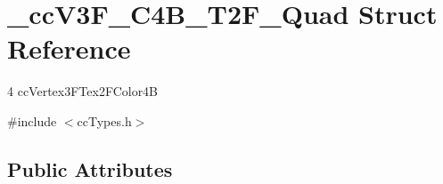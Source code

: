 \hypertarget{struct__cc_v3_f___c4_b___t2_f___quad}{\section{\-\_\-cc\-V3\-F\-\_\-\-C4\-B\-\_\-\-T2\-F\-\_\-\-Quad Struct Reference}
\label{struct__cc_v3_f___c4_b___t2_f___quad}
}


4 cc\-Vertex3\-F\-Tex2\-F\-Color4\-B  




{\ttfamily \#include $<$cc\-Types.\-h$>$}

\subsection*{Public Attributes}
